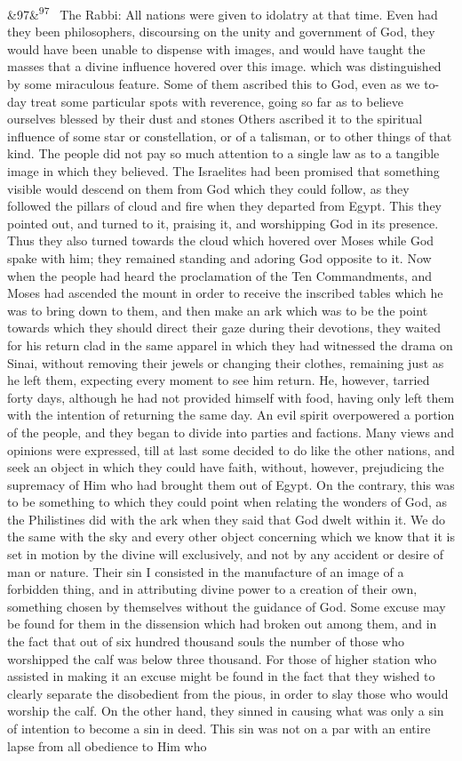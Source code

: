 \documentclass[12pt]{article}
\newcommand{\para}[1][]{\par\noindent\ifx&#1&\else\textsuperscript{\footnotesize #1}~\fi}
\begin{document}
\para[97] The Rabbi: All nations were given to idolatry at that time. Even had they been philosophers, discoursing on the unity and government of God, they would have been unable to dispense with images, and would have taught the masses that a divine influence hovered over this image. which was distinguished by some miraculous feature. Some of them ascribed this to God, even as we to-day treat some particular spots with reverence, going so far as to believe ourselves blessed by their dust and stones Others ascribed it to the spiritual influence of some star or constellation, or of a talisman, or to other things of that kind. The people did not pay so much attention to a single law as to a tangible image in which they believed. The Israelites had been promised that something visible would descend on them from God which they could follow, as they followed the pillars of cloud and fire when they departed from Egypt. This they pointed out, and turned to it, praising it, and worshipping God in its presence. Thus they also turned towards the cloud which hovered over Moses while God spake with him; they remained standing and adoring God opposite to it. Now when the people had heard the proclamation of the Ten Commandments, and Moses had ascended the mount in order to receive the inscribed tables which he was to bring down to them, and then make an ark which was to be the point towards which they should direct their gaze during their devotions, they waited for his return clad in the same apparel in which they had witnessed the drama on Sinai, without removing their jewels or changing their clothes, remaining just as he left them, expecting every moment to see him return. He, however, tarried forty days, although he had not provided himself with food, having only left them with the intention of returning the same day. An evil spirit overpowered a portion of the people, and they began to divide into parties and factions. Many views and opinions were expressed, till at last some decided to do like the other nations, and seek an object in which they could have faith, without, however, prejudicing the supremacy of Him who had brought them out of Egypt. On the contrary, this was to be something to which they could point when relating the wonders of God, as the Philistines did with the ark when they said that God dwelt within it. We do the same with the sky and every other object concerning which we know that it is set in motion by the divine will exclusively, and not by any accident or desire of man or nature. Their sin I consisted in the manufacture of an image of a forbidden thing, and in attributing divine power to a creation of their own, something chosen by themselves without the guidance of God. Some excuse may be found for them in the dissension which had broken out among them, and in the fact that out of six hundred thousand souls the number of those who worshipped the calf was below three thousand. For those of higher station who assisted in making it an excuse might be found in the fact that they wished to clearly separate the disobedient from the pious, in order to slay those who would worship the calf. On the other hand, they sinned in causing what was only a sin of intention to become a sin in deed. This sin was not on a par with an entire lapse from all obedience to Him who 
\end{document}
